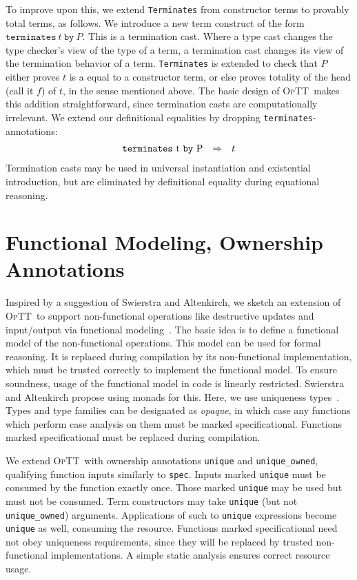 \documentclass[preprint,natbib]{sigplanconf}
\newcommand{\optt}{\textsc{OpTT}}
\newcommand{\To}{\Rightarrow}
\begin{document}
To improve upon this, we extend \texttt{Terminates} from constructor
terms to provably total terms, as follows.  We introduce a new term
construct of the form $\texttt{terminates}\ t\ \texttt{by}\ P$.  This
is a termination cast.  Where a type cast changes the type checker's
view of the type of a term, a termination cast changes its view of the
termination behavior of a term.  \texttt{Terminates} is extended to
check that $P$ either proves $t$ is a equal to a constructor term, or
else proves totality of the head (call it $f$) of $t$, in the sense
mentioned above.  The basic design of \optt\ makes this addition
straightforward, since termination casts are computationally
irrelevant.  We extend our definitional equalities by dropping
\texttt{terminates}-annotations:
\[
\begin{array}{lll}
$\texttt{terminates}\ t\ \texttt{by}\ P$ & \To & t
\end{array}
\]
\noindent Termination casts may be used in universal instantiation and
existential introduction, but are eliminated by definitional equality
during equational reasoning.

\section{Functional Modeling, Ownership Annotations}
\label{sec:model}

Inspired by a suggestion of Swierstra and Altenkirch, we sketch an
extension of \optt\ to support non-functional operations like
destructive updates and input/output via functional
modeling~\cite{swierstra+07}.  The basic idea is to define a
functional model of the non-functional operations.  This model can be
used for formal reasoning.  It is replaced during compilation by its
non-functional implementation, which must be trusted correctly to
implement the functional model.  To ensure soundness, usage of the
functional model in code is linearly restricted.  Swierstra and
Altenkirch propose using monads for this.  Here, we use uniqueness
types~\cite{barendsen+93}.  Types and type families can be designated
as \emph{opaque}, in which case any functions which perform case
analysis on them must be marked specificational.  Functions marked
specificational must be replaced during compilation.

We extend \optt\ with ownership annotations \texttt{unique} and
\texttt{unique\_owned}, qualifying function inputs similarly to
\texttt{spec}.  Inputs marked \texttt{unique} must be consumed by the
function exactly once.  Those marked \texttt{unique} may be used but
must not be consumed.  Term constructors may take \texttt{unique} (but
not \texttt{unique\_owned}) arguments.  Applications of such to
\texttt{unique} expressions become \texttt{unique} as well, consuming
the resource.  Functions marked specificational need not obey
uniqueness requirements, since they will be replaced by trusted
non-functional implementations.  A simple static analysis ensures
correct resource usage.
\end{document}
